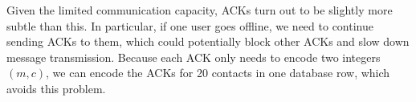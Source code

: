Given the limited communication capacity, ACKs turn out to be slightly more subtle than this. In particular, if one user goes offline, we need to continue sending ACKs to them, which could potentially block other ACKs and slow down message transmission. Because each ACK only needs to encode two integers $(m, c)$, we can encode the ACKs for 20 contacts in one database row, which avoids this problem.